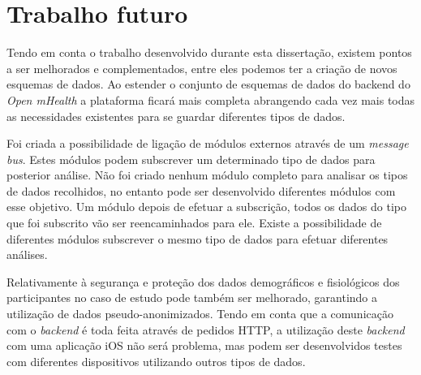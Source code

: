 \section{Trabalho futuro}
Tendo em conta o trabalho desenvolvido durante esta dissertação, existem pontos a ser melhorados e complementados, entre eles podemos ter a criação de novos esquemas de dados. Ao estender o conjunto de esquemas de dados do backend do \textit{Open mHealth} a plataforma ficará mais completa abrangendo cada vez mais todas as necessidades existentes para se guardar diferentes tipos de dados.\par
Foi criada a possibilidade de ligação de módulos externos através de um \textit{message bus}. Estes módulos podem subscrever um determinado tipo de dados para posterior análise. Não foi criado nenhum módulo completo para analisar os tipos de dados recolhidos, no entanto pode ser desenvolvido diferentes módulos com esse objetivo. Um módulo depois de efetuar a subscrição, todos os dados do tipo que foi subscrito vão ser reencaminhados para ele. Existe a possibilidade de diferentes módulos subscrever o mesmo tipo de dados para efetuar diferentes análises.\par
Relativamente à segurança e proteção dos dados demográficos e fisiológicos dos participantes no caso de estudo pode também ser melhorado, garantindo a utilização de dados pseudo-anonimizados.
Tendo em conta que a comunicação com o \textit{backend} é toda feita através de pedidos \gls{HTTP}, a utilização deste \textit{backend} com uma aplicação iOS não será problema, mas podem ser desenvolvidos testes com diferentes dispositivos utilizando outros tipos de dados.

\cleardoublepage